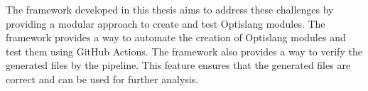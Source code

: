The framework developed in this thesis aims to address these challenges by providing a modular approach to create and test Optislang modules. The framework 
provides a way to automate the creation of Optislang modules and test them using GitHub Actions. The framework also provides a way to verify the generated 
files by the pipeline. This feature ensures that the generated files are correct and can be used for further analysis. 